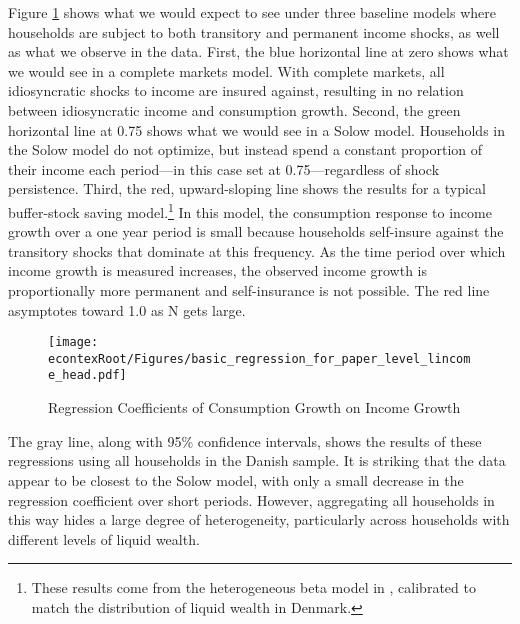 \documentclass[titlepage]{\econtex}\newcommand{\texname}{ConsumptionHeterogeneity}
\begin{document}
	Figure \ref{fig:GrowthReg} shows what we would expect to see under three baseline models where households are subject to both transitory and permanent income shocks, as well as what we observe in the data. First, the blue horizontal line at zero shows what we would see in a complete markets model. With complete markets, all idiosyncratic shocks to income are insured against, resulting in no relation between idiosyncratic income and consumption growth. Second, the green horizontal line at 0.75 shows what we would see in a Solow model. Households in the Solow model do not optimize, but instead spend a constant proportion of their income each period---in this case set at 0.75---regardless of shock persistence. Third, the red, upward-sloping line shows the results for a typical buffer-stock saving model.\footnote{These results come from the heterogeneous beta model in \cite{carroll_distribution_2017}, calibrated to match the distribution of liquid wealth in Denmark.} In this model, the consumption response to income growth over a one year period is small because households self-insure against the transitory shocks that dominate at this frequency. As the time period over which income growth is measured increases, the observed income growth is proportionally more permanent and self-insurance is not possible. The red line asymptotes toward 1.0 as N gets large.
	\begin{figure} 
		\begin{centering}
			\texttt{[image: \\econtexRoot/Figures/basic\_regression\_for\_paper\_level\_lincome\_head.pdf]}
			\caption{Regression Coefficients of Consumption Growth on Income Growth}
			\label{fig:GrowthReg}
		\end{centering}
	\end{figure}
	
	The gray line, along with 95\% confidence intervals, shows the results of these regressions using all households in the Danish sample. It is striking that the data appear to be closest to the Solow model, with only a small decrease in the regression coefficient over short periods. However, aggregating all households in this way hides a large degree of heterogeneity, particularly across households with different levels of liquid wealth.
	
\end{document}
